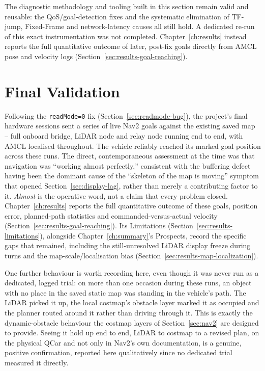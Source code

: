 The diagnostic methodology and tooling built in this section remain
valid and reusable: the QoS/goal-detection fixes and the systematic
elimination of TF-jump, Fixed-Frame and network-latency causes all
still hold. A dedicated re-run of this exact instrumentation was not
completed. Chapter~\ref{ch:results} instead reports the full quantitative outcome
of later, post-fix goals directly from AMCL pose and velocity logs
(Section~\ref{sec:results-goal-reaching}).

\section{Final Validation}
\label{sec:final-validation}

Following the \texttt{readMode=0} fix (Section~\ref{sec:readmode-bug}),
the project's final hardware sessions sent a series of live Nav2 goals
against the existing saved map -- full onboard bridge, LiDAR node and
relay node running end to end, with AMCL localised throughout. The
vehicle reliably reached its marked goal position across these runs.
The direct, contemporaneous assessment at the time was that navigation
was ``working almost perfectly,'' consistent with the buffering
defect having been the dominant cause of the ``skeleton of the map is
moving'' symptom that opened Section~\ref{sec:display-lag}, rather
than merely a contributing factor to it. \emph{Almost} is the
operative word, not a claim that every problem closed. Chapter~\ref{ch:results}
reports the full quantitative outcome of these goals, position error,
planned-path statistics and commanded-versus-actual velocity
(Section~\ref{sec:results-goal-reaching}). Its Limitations
(Section~\ref{sec:results-limitations}), alongside
Chapter~\ref{ch:summary}'s Prospects, record the specific gaps that
remained, including the still-unresolved LiDAR display freeze during
turns and the map-scale/localisation bias
(Section~\ref{sec:results-map-localization}).

One further behaviour is worth recording here, even though it was
never run as a dedicated, logged trial: on more than one occasion
during these runs, an object with no place in the saved static map
was standing in the vehicle's path. The LiDAR picked it up, the local
costmap's obstacle layer marked it as occupied and the planner routed
around it rather than driving through it. This is exactly the
dynamic-obstacle behaviour the costmap layers of
Section~\ref{sec:nav2} are designed to provide. Seeing it hold up
end to end, LiDAR to costmap to a revised plan, on the physical QCar
and not only in Nav2's own documentation, is a genuine, positive
confirmation, reported here qualitatively since no dedicated trial
measured it directly.

